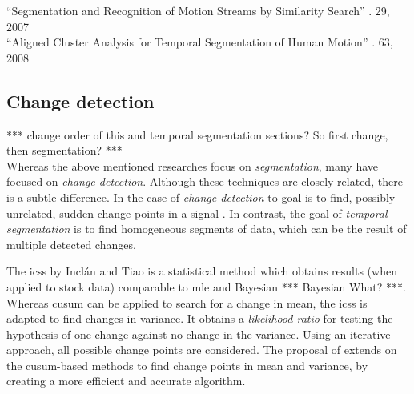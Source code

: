 
``Segmentation and Recognition of Motion Streams by Similarity Search'' \cite{li2007segmentation}. 29, 2007 \\





``Aligned Cluster Analysis for Temporal Segmentation of Human Motion'' \cite{zhou2008aligned}. 63, 2008 \\


\subsection{Change detection}\label{subsec:change_detection}
*** change order of this and temporal segmentation sections? So first change, then segmentation? *** \\
Whereas the above mentioned researches focus on \emph{segmentation}, many have focused on \emph{change detection}.
Although these techniques are closely related, there is a subtle difference.
In the case of \emph{change detection} to goal is to find, possibly unrelated, sudden change points in a signal \cite{takeuchi2006unifying}.
In contrast, the goal of \emph{temporal segmentation} is to find homogeneous segments of data, which can be the result of multiple detected changes.

The \gls{icss} by Incl\'{a}n and Tiao \cite{inclan1994use} is a statistical method which obtains results (when applied to stock data) comparable to \gls{mle} and Bayesian *** Bayesian What? ***.
Whereas \gls{cusum} can be applied to search for a change in mean, the \gls{icss} is adapted to find changes in variance.
It obtains a \emph{likelihood ratio} for testing the hypothesis of one change against no change in the variance.
Using an iterative approach, all possible change points are considered.
The proposal of \cite{cheng2009efficient} extends on the \gls{cusum}-based methods to find change points in mean and variance, by creating a more efficient and accurate algorithm.

